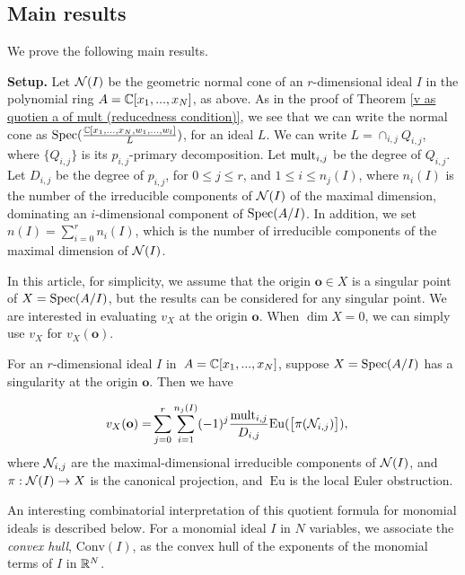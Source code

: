 \documentclass[11pt,a4paper,leqno,noamsfonts]{amsart}
\numberwithin{equation}{section}
\begin{document}
\subsection{Main results} We prove the following main results.

{\bf Setup.} Let ${\mathcal N}(I)$ be the geometric normal cone of an $r$-dimensional 
ideal $I$ in the polynomial ring $A={\mathbb{C}}[x_1,...,x_N]$, as above. As in the proof of Theorem \ref{v as quotien a of mult (reducedness condition)}, we see that we can write the normal cone as $\operatorname{Spec}(\frac{{\mathbb{C}}[x_1,\ldots,x_N,w_1,\ldots,w_l]}{L})$, for an ideal $L$. We can write $L=\cap_{i,j} Q_{i,j}$, where $\{Q_{i,j}\}$ is its $p_{i,j}$-primary decomposition.  Let $\mathrm{mult}_{i,j}$ be the degree of  $Q_{i,j}$.  Let $D_{i,j}$ be the degree of $p_{i,j}$, for $0\leq j \leq r$, and $1\leq i \leq n_j(I)$, where $n_i(I)$ is the number of the irreducible components of ${\mathcal N}(I)$ of the maximal dimension, dominating an $i$-dimensional component of $\operatorname{Spec}(A/I)$. In addition, we set $n(I)=\sum_{i=0}^{r}n_i(I)$, which is the number of irreducible components of the maximal dimension of ${\mathcal N}(I)$.



In this article, for simplicity, we assume that the origin $\mathbf{o}\in X$ is a singular point of $X=\operatorname{Spec}(A/I)$, but the results can be considered for any singular point. We are interested in evaluating $v_X$ at the origin $\mathbf{o}$. When $\dim X=0$, we can simply use $v_X$ for $v_X(\mathbf{o})$. 

\begin{thm} \label{generalConjecture} 
For an $r$-dimensional  
ideal $I$ in $\text{\:}A={\mathbb{C}}[x_1,...,x_N]$, suppose  $X=\operatorname{Spec}(A/I)$
has a singularity at the origin $\mathbf{o}$. Then we have


\begin{align}
v_X(\mathbf{o})=&\sum_{j=0}^{r}\sum_{i=1}^{n_j(I)}(-1)^j\frac{\mathrm{mult}_{i,j}}{D_{i,j}}\mathrm{Eu}(\big[\pi({\mathcal N}_{i,j})\big]),
\end{align}
where ${\mathcal N}_{i,j}$ are the maximal-dimensional irreducible components of ${\mathcal N}(I)$, and $\pi:{\mathcal N}(I)\to X$ is the canonical projection, and $\:{}\mathrm{Eu}$ is the local Euler obstruction.

\end{thm}

An interesting combinatorial interpretation of this quotient formula for monomial ideals is described below. For a monomial ideal $I$ in $N$ variables, we associate the \emph{convex hull}, $\mathrm{Conv}(I)$, as the convex hull of the exponents of the monomial terms of $I$ in ${\mathbb{R}}^N$.
\end{document}
